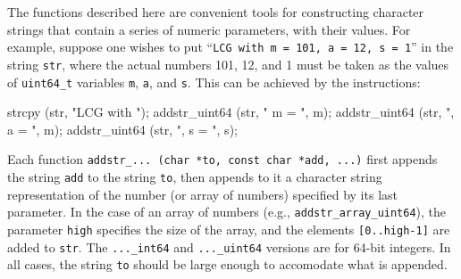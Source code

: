 
The functions described here are convenient tools for constructing
character strings that contain a series of numeric parameters, with their values.
For example, suppose one wishes to put 
``{\tt LCG with m = 101, a = 12, s = 1}'' in the string {\tt str}, 
where the actual 
numbers 101, 12, and 1 must be taken as the values of {\tt uint64\_t}
variables {\tt m}, {\tt a}, and {\tt s}.  
This can be achieved by the instructions:
\vcode

   strcpy (str, "LCG with ");
   addstr\_uint64 (str, " m = ", m);
   addstr\_uint64 (str, ", a = ", m);
   addstr\_uint64 (str, ", s = ", s);
\endvcode

Each function {\tt addstr\_... (char *to, const char *add, ...)}
first appends the string {\tt add} to the string {\tt to}, then
appends to it a character string representation of the number 
(or array of numbers) specified by its last parameter.
In the case of an array of numbers (e.g., {\tt addstr\_array\_uint64}),
the parameter {\tt high} specifies the size of the array, and the
elements {\tt [0..high-1]} are added to {\tt str}.
The {\tt ...\_int64} and {\tt ...\_uint64} versions are for 64-bit integers.
In all cases, the string {\tt to} should be large enough to accomodate
what is appended.


